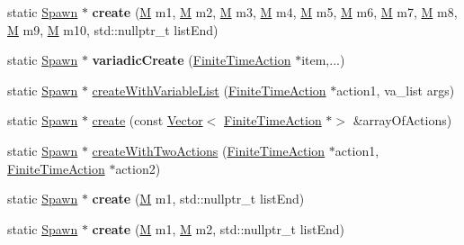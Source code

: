 \begin{DoxyCompactItemize}
\item 
\mbox{\label{classSpawn_aa9c7d80ccc68f18663d1d7d215661a38}} 
static \hyperlink{classSpawn}{Spawn} $\ast$ {\bfseries create} (\hyperlink{classSpawn_a3b3334ea4e6fe3664be6cbea9743db88}{M} m1, \hyperlink{classSpawn_a3b3334ea4e6fe3664be6cbea9743db88}{M} m2, \hyperlink{classSpawn_a3b3334ea4e6fe3664be6cbea9743db88}{M} m3, \hyperlink{classSpawn_a3b3334ea4e6fe3664be6cbea9743db88}{M} m4, \hyperlink{classSpawn_a3b3334ea4e6fe3664be6cbea9743db88}{M} m5, \hyperlink{classSpawn_a3b3334ea4e6fe3664be6cbea9743db88}{M} m6, \hyperlink{classSpawn_a3b3334ea4e6fe3664be6cbea9743db88}{M} m7, \hyperlink{classSpawn_a3b3334ea4e6fe3664be6cbea9743db88}{M} m8, \hyperlink{classSpawn_a3b3334ea4e6fe3664be6cbea9743db88}{M} m9, \hyperlink{classSpawn_a3b3334ea4e6fe3664be6cbea9743db88}{M} m10, std\+::nullptr\+\_\+t list\+End)
\item 
\mbox{\label{classSpawn_a716fe714ebf2092b813202224cc355c0}} 
static \hyperlink{classSpawn}{Spawn} $\ast$ {\bfseries variadic\+Create} (\hyperlink{classFiniteTimeAction}{Finite\+Time\+Action} $\ast$item,...)
\item 
static \hyperlink{classSpawn}{Spawn} $\ast$ \hyperlink{classSpawn_a08a30e179a171b59c3770a190f93443e}{create\+With\+Variable\+List} (\hyperlink{classFiniteTimeAction}{Finite\+Time\+Action} $\ast$action1, va\+\_\+list args)
\item 
static \hyperlink{classSpawn}{Spawn} $\ast$ \hyperlink{classSpawn_a0d1dac3657853dc578bb1b3fb14df6d5}{create} (const \hyperlink{classVector}{Vector}$<$ \hyperlink{classFiniteTimeAction}{Finite\+Time\+Action} $\ast$$>$ \&array\+Of\+Actions)
\item 
static \hyperlink{classSpawn}{Spawn} $\ast$ \hyperlink{classSpawn_aa65c571082a34ba56a00a30803538d47}{create\+With\+Two\+Actions} (\hyperlink{classFiniteTimeAction}{Finite\+Time\+Action} $\ast$action1, \hyperlink{classFiniteTimeAction}{Finite\+Time\+Action} $\ast$action2)
\item 
\mbox{\label{classSpawn_a1359ec5285ad3d548821e53e71d14152}} 
static \hyperlink{classSpawn}{Spawn} $\ast$ {\bfseries create} (\hyperlink{classSpawn_a3b3334ea4e6fe3664be6cbea9743db88}{M} m1, std\+::nullptr\+\_\+t list\+End)
\item 
\mbox{\label{classSpawn_a635254a412dd0ad113f9757b464bdd02}} 
static \hyperlink{classSpawn}{Spawn} $\ast$ {\bfseries create} (\hyperlink{classSpawn_a3b3334ea4e6fe3664be6cbea9743db88}{M} m1, \hyperlink{classSpawn_a3b3334ea4e6fe3664be6cbea9743db88}{M} m2, std\+::nullptr\+\_\+t list\+End)
$$
\end{DoxyCompactItemize}
